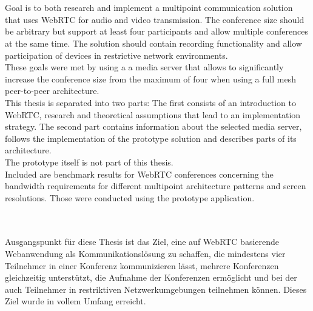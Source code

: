 
\clearpage
\begingroup\let\clearpage\relax
\thispagestyle{empty} %


\\\\
\noindent
Goal is to both research and implement a multipoint communication solution that uses WebRTC for audio and video transmission. The conference size should be arbitrary but support at least four participants and allow multiple conferences at the same time. 
The solution should contain recording functionality and allow participation of devices in restrictive network environments.\\

These goals were met by using a a media server that allows to significantly increase the conference size from the maximum of four when using a full mesh peer-to-peer architecture.\\

This thesis is separated into two parts: The first consists of an introduction to WebRTC, research and theoretical assumptions that lead to an implementation strategy. The second part contains information about the selected media server, follows the implementation of the prototype solution and describes parts of its architecture.\\
The prototype itself is not part of this thesis.\\

Included are benchmark results for WebRTC conferences concerning the bandwidth requirements for different multipoint architecture patterns and screen resolutions. Those were conducted using the prototype application.\par



\vspace{3cm}

\\\\
\noindent 
Ausgangspunkt für diese Thesis ist das Ziel, eine auf WebRTC basierende Web\-anwendung als Kommunikationslösung zu schaffen, die mindestens vier Teilnehmer in einer Konferenz kommunizieren lässt, mehrere Konferenzen gleichzeitig unterstützt, die Aufnahme der Konferenzen ermöglicht und bei der auch Teilnehmer in restriktiven Netzwerkumgebungen teilnehmen können. Dieses Ziel wurde in vollem Umfang erreicht.\\

